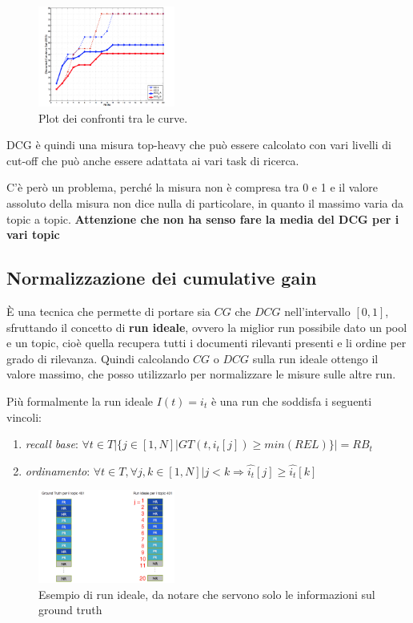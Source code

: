 \begin{figure}[htbp]
	\centering
	\includegraphics[width=0.4\textwidth]{images/l16-fig-6.png}
	\caption{Plot dei confronti tra le curve.}
\end{figure}

\noindent DCG è quindi una misura top-heavy che può essere calcolato con vari livelli di cut-off che può anche essere adattata ai vari task di ricerca.

C'è però un problema, perché la misura non è compresa tra 0 e 1 e il valore assoluto della misura non dice nulla di particolare, in quanto il massimo varia da topic a topic. \textbf{Attenzione che non ha senso fare la media del DCG per i vari topic}

\subsection{Normalizzazione dei cumulative gain}

\`E una tecnica che permette di portare sia $CG$ che $DCG$ nell'intervallo $[0,1]$, sfruttando il concetto di \textbf{run ideale}, ovvero la miglior run possibile dato un pool e un topic, cioè quella recupera tutti i documenti rilevanti presenti e li ordine per grado di rilevanza.
Quindi calcolando $CG$ o $DCG$ sulla run ideale ottengo il valore massimo, che posso utilizzarlo per normalizzare le misure sulle altre run.

Più formalmente la run ideale $I(t) = i_t$ è una run che soddisfa i seguenti vincoli:

\begin{enumerate}
	\item \textit{recall base}: $\forall t \in T \big | \{ j \in [1,N] | GT(t,i_t[j]) \geq min(REL) \} \big | = RB_t$
	\item \textit{ordinamento}: $\forall t \in T, \forall j,k \in [1,N] | j < k \Rightarrow \hat{i_t}[j] \geq \hat{i_t}[k]$
\end{enumerate}

\begin{figure}[htbp]
	\centering
	\includegraphics[width=0.4\textwidth]{images/l16-fig-7.png}
	\caption{Esempio di run ideale, da notare che servono solo le informazioni sul ground truth}
\end{figure}

